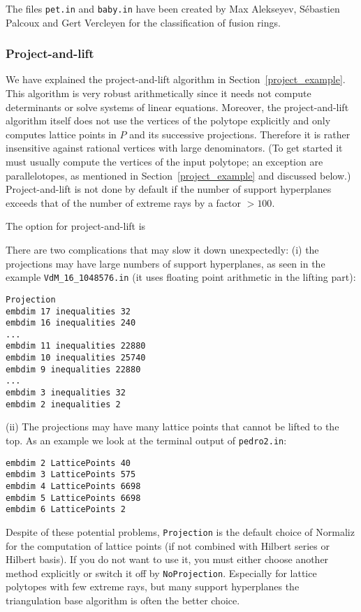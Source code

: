 The files \verb|pet.in| and \verb|baby.in| have been created by Max Alekseyev, Sébastien Palcoux and Gert Vercleyen for the classification of fusion rings.

\subsubsection{Project-and-lift}\label{project}

We have explained the project-and-lift algorithm in Section~\ref{project_example}.
This algorithm is very robust arithmetically since it needs not compute determinants or solve systems of linear equations. Moreover, the project-and-lift algorithm itself does not use the vertices of the polytope explicitly and only computes lattice points in $P$ and its successive projections. Therefore it is rather insensitive against rational vertices with large denominators. (To get started it must usually compute the vertices of the input polytope; an exception are parallelotopes, as mentioned in Section~\ref{project_example} and discussed below.) Project-and-lift is not done by default if the number of support hyperplanes exceeds that of the number of extreme rays by a factor $>100$.

The option for project-and-lift is
\begin{itemize}
	\itemtt [Projection, -j]
\end{itemize}

There are two complications that may slow it down unexpectedly: (i) the projections may have large numbers of support hyperplanes, as seen in the example \verb|VdM_16_1048576.in| (it uses floating point arithmetic in the lifting part):
\begin{Verbatim}
Projection
embdim 17 inequalities 32
embdim 16 inequalities 240
...
embdim 11 inequalities 22880
embdim 10 inequalities 25740
embdim 9 inequalities 22880
...
embdim 3 inequalities 32
embdim 2 inequalities 2
\end{Verbatim}

(ii) The projections may have many lattice points that cannot be lifted to the top. As an example we look at the terminal output of \verb|pedro2.in|:
\begin{Verbatim}
embdim 2 LatticePoints 40
embdim 3 LatticePoints 575
embdim 4 LatticePoints 6698
embdim 5 LatticePoints 6698
embdim 6 LatticePoints 2
\end{Verbatim}

Despite of these potential problems, \verb|Projection| is the default choice of Normaliz for the computation of lattice points (if not combined with Hilbert series or Hilbert basis). If you do not want to use it, you must either choose another method explicitly or switch it off by \verb|NoProjection|. Especially for lattice polytopes with few extreme rays, but many support hyperplanes the triangulation base algorithm is often the better choice.

